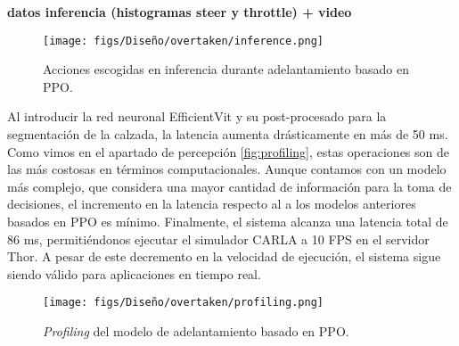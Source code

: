 \textbf{datos inferencia (histogramas steer y throttle) + video}
\begin{figure}[ht]
\centering
\texttt{[image: figs/Diseño/overtaken/inference.png]}
\caption{Acciones escogidas en inferencia durante adelantamiento basado en \ac{PPO}.}
\label{fig:inference_overtaken}
\end{figure}

Al introducir la red neuronal EfficientVit y su post-procesado para la segmentación de la calzada, la latencia aumenta drásticamente en más de 50 ms. Como vimos en el apartado de percepción \ref{fig:profiling}, estas operaciones son de las más costosas en términos computacionales. Aunque contamos con un modelo más complejo, que considera una mayor cantidad de información para la toma de decisiones, el incremento en la latencia respecto al a los modelos anteriores basados en \ac{PPO} es mínimo. Finalmente, el sistema alcanza una latencia total de 86 ms, permitiéndonos ejecutar el simulador CARLA a 10 \ac{FPS} en el servidor Thor. A pesar de este decremento en la velocidad de ejecución, el sistema sigue siendo válido para aplicaciones en tiempo real.
\begin{figure}[ht]
\centering
\texttt{[image: figs/Diseño/overtaken/profiling.png]}
\caption{\textit{Profiling} del modelo de adelantamiento basado en \ac{PPO}.}
\label{fig:profiling_overtaken}
\end{figure}


